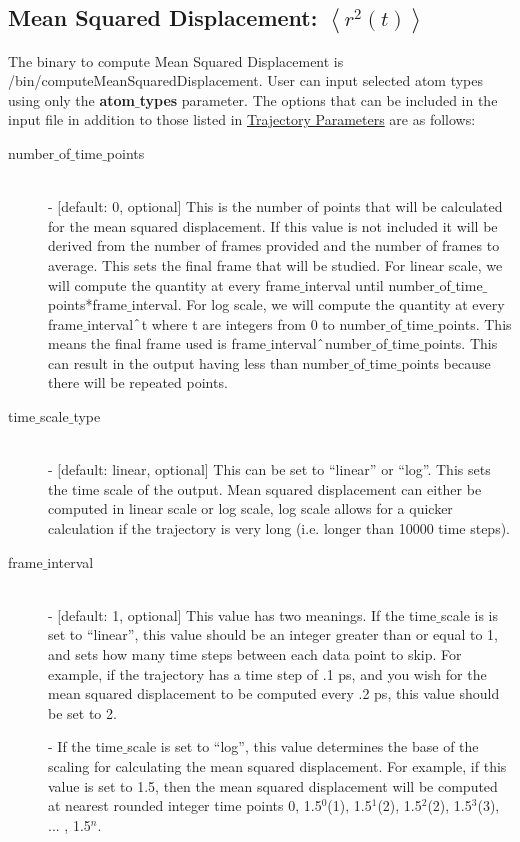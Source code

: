 \documentclass{article}
\begin{document}
\subsection{Mean Squared Displacement: $\left<r^2(t)\right>$} \label{sec::MSD_parm}
The binary to compute Mean Squared Displacement is /bin/computeMeanSquaredDisplacement. User can input selected atom types using only the \textbf{atom$\_$types} parameter. The options that can be included in the input file in addition to those listed in \hyperref[sec::general_parameters]{Trajectory Parameters} are as follows:
\begin{description}	
	\item[number$\_$of$\_$time$\_$points]\hfill \\
	- [default: 0, optional] This is the number of points that will be calculated for the mean squared displacement.  If this value is not included it will be derived from the number of frames provided and the number of frames to average.  This sets the final frame that will be studied.  For linear scale, we will compute the quantity at every frame$\_$interval until number$\_$of$\_$time$\_$points*frame$\_$interval.  For log scale, we will compute the quantity at every frame$\_$interval$\string^$t where t are integers from 0 to number$\_$of$\_$time$\_$points.  This means the final frame used is frame$\_$interval$\string^$number$\_$of$\_$time$\_$points.  This can result in the output having less than number$\_$of$\_$time$\_$points because there will be repeated points.
	
	\item[time$\_$scale$\_$type] \hfill \\
	- [default: linear, optional] This can be set to ``linear'' or ``log''.  This sets the time scale of the output. Mean squared displacement can either be computed in linear scale or log scale, log scale allows for a quicker calculation if the trajectory is very long (i.e. longer than 10000 time steps).
	
	\item[frame$\_$interval] \hfill \\
	- [default: 1, optional] This value has two meanings.  If the time$\_$scale is is set to ``linear'', this value should be an integer greater than or equal to 1, and sets how many time steps between each data point to skip.  For example, if the trajectory has a time step of .1 ps, and you wish for the mean squared displacement to be computed every .2 ps, this value should be set to 2. 
	
	- If the time$\_$scale is set to ``log'', this value determines the base of the scaling for calculating the mean squared displacement.  For example, if this value is set to 1.5, then the mean squared displacement will be computed at nearest rounded integer time points 0, 1.5$^0$(1), 1.5$^1$(2), 1.5$^2$(2), 1.5$^3$(3), ... , 1.5$^{n}$.
	

\end{description}
\end{document}
